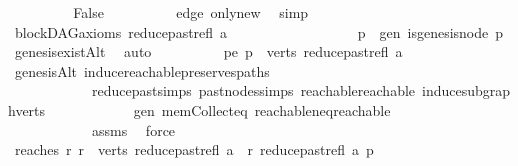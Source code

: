 \begin{isabellebody}
\ \ \ \ \ \ \isamarkupfalse%
\ \isamarkupfalse%
\ False\isanewline
\ \ \ \ \ \ \ \ \isamarkupfalse%
\ edge\ only{\isacharunderscore}{\kern0pt}new\ \isamarkupfalse%
\ simp\isanewline
\ \ \ \ \isamarkupfalse%
\isanewline
\ \ \isamarkupfalse%
\isanewline
\ \ \isamarkupfalse%
\isanewline
\ \ \ \ \isamarkupfalse%
\ {\isachardoublequoteopen}blockDAG{\isacharunderscore}{\kern0pt}axioms\ {\isacharparenleft}{\kern0pt}reduce{\isacharunderscore}{\kern0pt}past{\isacharunderscore}{\kern0pt}refl\ a{\isacharparenright}{\kern0pt}{\isachardoublequoteclose}\isanewline
\ \ \ \ \ \ \isamarkupfalse%
\ {\isacharminus}{\kern0pt}\isanewline
\ \ \ \ \ \ \ \ \isamarkupfalse%
\ p\ \ gen{\isacharcolon}{\kern0pt}\ {\isachardoublequoteopen}is{\isacharunderscore}{\kern0pt}genesis{\isacharunderscore}{\kern0pt}node\ p{\isachardoublequoteclose}\ \isamarkupfalse%
\ genesis{\isacharunderscore}{\kern0pt}existAlt\ \isamarkupfalse%
\ auto\isanewline
\ \ \ \ \ \ \ \ \isamarkupfalse%
\ pe{\isacharcolon}{\kern0pt}\ {\isachardoublequoteopen}p\ {\isasymin}\ verts\ {\isacharparenleft}{\kern0pt}reduce{\isacharunderscore}{\kern0pt}past{\isacharunderscore}{\kern0pt}refl\ a{\isacharparenright}{\kern0pt}{\isachardoublequoteclose}\isanewline
\ \ \ \ \ \ \ \ \isamarkupfalse%
\ genesisAlt\ induce{\isacharunderscore}{\kern0pt}reachable{\isacharunderscore}{\kern0pt}preserves{\isacharunderscore}{\kern0pt}paths\isanewline
\ \ \ \ \ \ \ \ \ \ \ \ reduce{\isacharunderscore}{\kern0pt}past{\isachardot}{\kern0pt}simps\ past{\isacharunderscore}{\kern0pt}nodes{\isachardot}{\kern0pt}simps\ reachable{}{\isacharunderscore}{\kern0pt}reachable\ induce{\isacharunderscore}{\kern0pt}subgraph{\isacharunderscore}{\kern0pt}verts\isanewline
\ \ \ \ \ \ \ \ \ \ \ \ gen\ mem{\isacharunderscore}{\kern0pt}Collect{\isacharunderscore}{\kern0pt}eq\ reachable{\isacharunderscore}{\kern0pt}neq{\isacharunderscore}{\kern0pt}reachable{}\isanewline
\ \ \ \ \ \ \ \ \ \ \ \ assms\ \isamarkupfalse%
\ force\ \ \ \ \isanewline
\ \ \ \ \ \ \ \ \isamarkupfalse%
\ reaches{\isacharcolon}{\kern0pt}\ {\isachardoublequoteopen}{\isacharparenleft}{\kern0pt}{\isasymforall}r{\isachardot}{\kern0pt}\ r\ {\isasymin}\ verts\ {\isacharparenleft}{\kern0pt}reduce{\isacharunderscore}{\kern0pt}past{\isacharunderscore}{\kern0pt}refl\ a{\isacharparenright}{\kern0pt}\ {\isasymlongrightarrow}\ r\ {\isasymrightarrow}\isactrlsup {\isacharasterisk}{\kern0pt}\isactrlbsub reduce{\isacharunderscore}{\kern0pt}past{\isacharunderscore}{\kern0pt}refl\ a\isactrlesub \ p{\isacharparenright}{\kern0pt}{\isachardoublequoteclose}\ \isanewline

\end{isabellebody}
